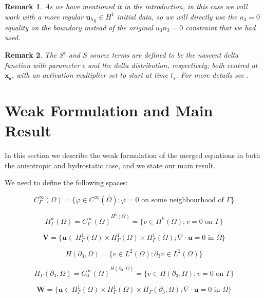 \documentclass[11pt]{article}
\newtheorem{remark}{Remark}
\begin{document}
    \begin{remark}
    \normalfont As we have mentioned it in the introduction, in this case we will work with a more regular ${\mathbf{u}_h}_0 \in H^1$ initial data, so we will directly use the $u_3 = 0$ equality on the boundary instead of the original $u_3 n_3 = 0$ constraint that we had used.
    \end{remark}
    
    \begin{remark}
    \normalfont The $S^\epsilon$ and $S$ source terms are defined to be the nascent delta function with parameter $\epsilon$ and the delta distribution, respectively; both centred at $\mathbf{x_s}$, with an activation multiplier set to start at time $t_s$. For more details see \cite{pollatmws2019}.
    \end{remark}

\section{Weak Formulation and Main Result} \label{weakformulationmainresult}

In this section we describe the weak formulation of the merged equations in both the anisotropic and hydrostatic case, and we state our main result.
  
  We need to define the following spaces:
  
  \[ C^{\infty}_\Gamma (\Omega) = \{ \varphi \in C^\infty (\bar{\Omega}); \varphi = 0 \text{ on some neighbourhood of } \Gamma\} \]
  
  \[ H^k_{\Gamma} (\Omega) = \overline{C_\Gamma ^ \infty (\Omega)} ^ {H^k (\Omega)} = \{ v \in H^k(\Omega); v=0 \text{ on } \Gamma \} \]
  
  \[ \mathbf{V} = \{ \mathbf{u} \in  H^1_{\Gamma} (\Omega) \times H^1_{\Gamma} (\Omega) \times H^1_{\Gamma} (\Omega); \nabla \cdot \mathbf{u} = 0 \text{ in } \Omega \} \]
  
  \[ H (\partial_3, \Omega) = \{ v \in L^2(\Omega); \partial_3 v \in L^2 (\Omega)\} \]
  
  \[ H_\Gamma (\partial_3, \Omega) = \overline{C_0 ^\infty (\Omega)}^{H (\partial_3, \Omega)} = \{ v \in H(\partial_3, \Omega); v = 0 \text{ on } \Gamma \} \]
  
  \[ \mathbf{W} = \{ \mathbf{u} \in  H^1_{\Gamma} (\Omega) \times H^1_{\Gamma} (\Omega) \times H_\Gamma (\partial_3, \Omega); \nabla \cdot \mathbf{u} = 0 \text{ in } \Omega \} \]
  
\end{document}
